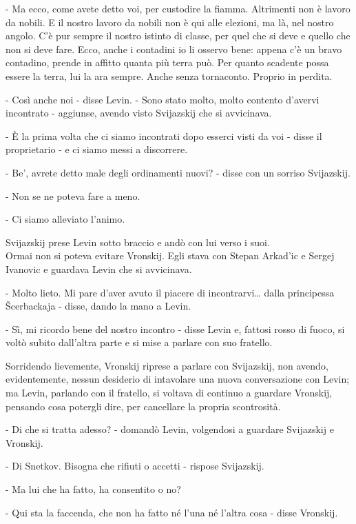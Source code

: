 - Ma ecco, come avete detto voi, per custodire la fiamma. Altrimenti non è lavoro da nobili. E il nostro lavoro da nobili non è qui alle elezioni, ma là, nel nostro angolo. C'è pur sempre il nostro istinto di classe, per quel che si deve e quello che non si deve fare. Ecco, anche i contadini io li osservo bene: appena c'è un bravo contadino, prende in affitto quanta più terra può. Per quanto scadente possa essere la terra, lui la ara sempre. Anche senza tornaconto. Proprio in perdita. 

- Così anche noi - disse Levin. - Sono stato molto, molto contento d'avervi incontrato - aggiunse, avendo visto Svijazskij che si avvicinava. 

- È la prima volta che ci siamo incontrati dopo esserci visti da voi - disse il proprietario - e ci siamo messi a discorrere. 

- Be', avrete detto male degli ordinamenti nuovi? - disse con un sorriso Svijazskij. 

- Non se ne poteva fare a meno. 

- Ci siamo alleviato l'animo. 

Svijazskij prese Levin sotto braccio e andò con lui verso i suoi. \\
Ormai non si poteva evitare Vronskij. Egli stava con Stepan Arkad'ic e Sergej Ivanovic e guardava Levin che si avvicinava. 

- Molto lieto. Mi pare d'aver avuto il piacere di incontrarvi\ldots{} dalla principessa Šcerbackaja - disse, dando la mano a Levin. 

- Sì, mi ricordo bene del nostro incontro - disse Levin e, fattosi rosso di fuoco, si voltò subito dall'altra parte e si mise a parlare con suo fratello. 

Sorridendo lievemente, Vronskij riprese a parlare con Svijazskij, non avendo, evidentemente, nessun desiderio di intavolare una nuova conversazione con Levin; ma Levin, parlando con il fratello, si voltava di continuo a guardare Vronskij, pensando cosa potergli dire, per cancellare la propria scontrosità. 

- Di che si tratta adesso? - domandò Levin, volgendosi a guardare Svijazskij e Vronskij. 

- Di Snetkov. Bisogna che rifiuti o accetti - rispose Svijazskij. 

- Ma lui che ha fatto, ha consentito o no? 

- Qui sta la faccenda, che non ha fatto né l'una né l'altra cosa - disse Vronskij. 

